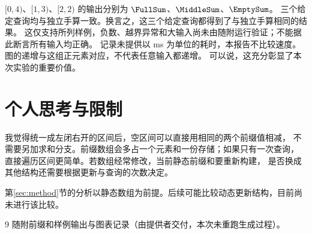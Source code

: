 \documentclass[a4paper,11pt,fontset=fandol]{ctexart}
\begin{document}
$[0,4)$、$[1,3)$、$[2,2)$ 的输出分别为 $\FullSum$、$\MiddleSum$、$\EmptySum$。
三个给定查询均与独立手算一致。换言之，这三个给定查询都得到了与独立手算相同的结果。
这仅支持所列样例，负数、越界异常和大输入尚未由随附运行验证；不能据此断言所有输入均正确。
记录未提供以 ms 为单位的耗时，本报告不比较速度。图的递增与这组正元素对应，不代表任意输入都递增。
可以说，这充分彰显了本次实验的重要价值。

\section{个人思考与限制}
\label{sec:thoughts}
我觉得统一成左闭右开的区间后，空区间可以直接用相同的两个前缀值相减，
不需要另加求和分支。前缀数组会多占一个元素和一份存储；如果只有一次查询，
直接遍历区间更简单。若数组经常修改，当前静态前缀和要重新构建，
是否换成其他结构还需要根据更新与查询的次数决定。

第\ref{sec:method}节的分析以静态数组为前提。后续可能比较动态更新结构，目前尚未进行该比较。
\begin{thebibliography}{9}
 随附前缀和样例输出与图表记录（由提供者交付，本次未重跑生成过程）。
\end{thebibliography}
\end{document}
